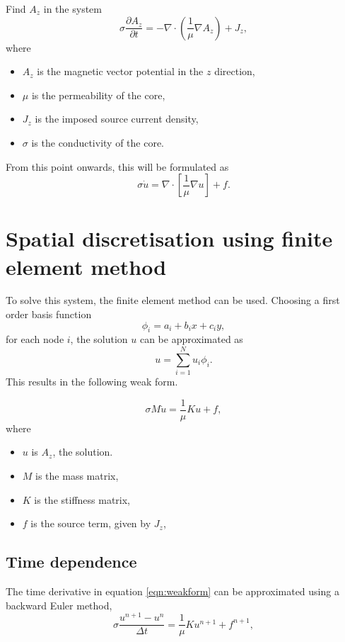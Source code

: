 \begin{problem}
    Find $A_z$ in the system
    \begin{equation}
        \sigma\frac{\partial A_z}{\partial t} = - \nabla \cdot \left(\frac{1}{\mu} \nabla A_z \right) + J_z,
    \end{equation}
    where
    \begin{itemize}
        \item $A_z$ is the magnetic vector potential in the $z$ direction,
        \item $\mu$ is the permeability of the core,
        \item $J_z$ is the imposed source current density,
        \item $\sigma$ is the conductivity of the core.
    \end{itemize}
    From this point onwards, this will be formulated as
    \begin{equation}
        \sigma\dot u = \nabla \cdot \left[\frac{1}{\mu}\nabla u\right] + f.
    \end{equation}
\end{problem}

\newpage
\section{Spatial discretisation using finite element method}
To solve this system, the finite element method can be used. Choosing a first order basis function 
\[
    \phi_i = a_i + b_i x + c_i y,
\]
for each node $i$, the solution $u$ can be approximated as
\[
    u = \sum_{i=1}^N u_i \phi_i.
\]
This results in the following weak form.
\begin{weakform}
    \begin{equation}
        \sigma M \dot u = \frac{1}{\mu}K u + f,
        \label{eqn:weakform}
    \end{equation}
    where
    \begin{itemize}
        \item $u$ is $A_z$, the solution.
        \item $M$ is the mass matrix,
        \item $K$ is the stiffness matrix,
        \item $f$ is the source term, given by $J_z$,
    \end{itemize}
\end{weakform}

\subsection{Time dependence}
The time derivative in equation \ref{eqn:weakform} can be approximated using a backward Euler method, 
\begin{equation}
    \sigma \frac{u^{n+1} - u^n}{\Delta t} = \frac{1}{\mu}K u^{n+1} + f^{n+1},
\end{equation}

